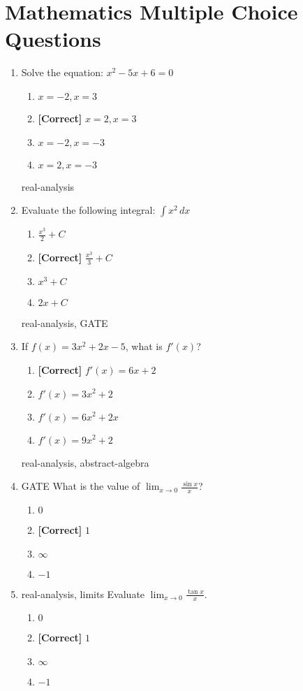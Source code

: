 \documentclass{article}
\newenvironment{problem}{\item}{}
\newcommand{\choice}{\item}
\newcommand{\correctchoice}{\item \textbf{[Correct] }}
\newcommand{\tags}[1]{#1} %
\begin{document}
\section{Mathematics Multiple Choice Questions}

    \begin{enumerate}
        \begin{problem}
        Solve the equation: $x^2 - 5x + 6 = 0$
            \begin{enumerate}
                \choice $x = -2, x = 3$
                \correctchoice $x = 2, x = 3$
                \choice $x = -2, x = -3$
                \choice $x = 2, x = -3$
            \end{enumerate}
            \tags{real-analysis}
        \end{problem}

        \begin{problem}
            Evaluate the following integral: $\int x^2 \, dx$
            \begin{enumerate}
                \choice $\frac{x^3}{2} + C$
                \correctchoice $\frac{x^3}{3} + C$
                \choice $x^3 + C$
                \choice $2x + C$
            \end{enumerate}
            \tags{real-analysis, GATE}
        \end{problem}

        \begin{problem}
            If $f(x) = 3x^2 + 2x - 5$, what is $f'(x)$?
            \begin{enumerate}
                \correctchoice $f'(x) = 6x + 2$
                \choice $f'(x) = 3x^2 + 2$
                \choice $f'(x) = 6x^2 + 2x$
                \choice $f'(x) = 9x^2 + 2$
            \end{enumerate}
            \tags{real-analysis, abstract-algebra}
        \end{problem}

        \begin{problem}
            \tags{GATE}
            What is the value of $\lim_{x \to 0} \frac{\sin x}{x}$?
            \begin{enumerate}
                \choice $0$
                \correctchoice $1$
                \choice $\infty$
                \choice $-1$
            \end{enumerate}
        \end{problem}

        \begin{problem}
            \tags{real-analysis, limits}
            Evaluate $\lim_{x \to 0} \frac{\tan x}{x}$.
            \begin{enumerate}
                \choice $0$
                \correctchoice $1$
                \choice $\infty$
                \choice $-1$
            \end{enumerate}
        \end{problem}
        

\end{enumerate}
\end{document}
